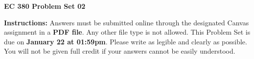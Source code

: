\documentclass[12pt]{exam}
\newcommand{\examdate}{\fontfamily{lmss} \textbf{January 22 at 01:59pm}} %
\begin{document}
\selectfont

\begin{center}
    \textbf{{\LARGE EC 380 Problem Set 02}} \\
    \bigskip 
\end{center}

\noindent \textbf{Instructions:} 
Answers must be submitted online through the designated Canvas assignment in a \textbf{PDF file}.
Any other file type is not allowed.
This Problem Set is due on \examdate.
Please write as legible and clearly as possible. 
You will not be given full credit if your answers cannot be easily understood. 


\end{document}

